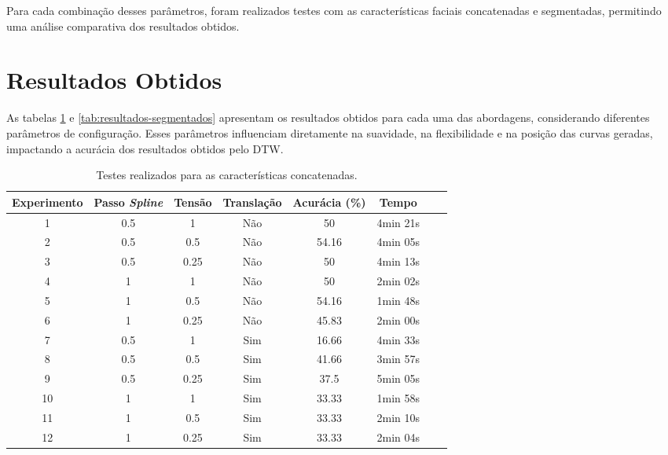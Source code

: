 Para cada combinação desses parâmetros, foram realizados testes com as características faciais concatenadas e segmentadas, permitindo uma análise comparativa dos resultados obtidos.

\section{Resultados Obtidos}

 As tabelas \ref{tab:resultados-concatenados} e \ref{tab:resultados-segmentados} apresentam os resultados obtidos para cada uma das abordagens, considerando diferentes parâmetros de configuração. Esses parâmetros influenciam diretamente na suavidade, na flexibilidade e na posição das curvas geradas, impactando a acurácia dos resultados obtidos pelo DTW.

\begin{table}[h!]
    \centering
    \caption{Testes realizados para as características concatenadas.}
    \begin{tabular}{|c|c|c|c|c|c|c|c|}
    \hline
    \textbf{Experimento} & \textbf{Passo \textit{Spline}} & \textbf{Tensão} & \textbf{Translação} & \textbf{Acurácia (\%)} & \textbf{Tempo} \\
    \hline
    1 & 0.5 & 1 & Não & 50 & 4min 21s\\
    2 & 0.5 & 0.5 & Não & 54.16 & 4min 05s\\
    3 & 0.5 & 0.25 & Não & 50 & 4min 13s\\

    4 & 1 & 1 & Não & 50 & 2min 02s\\
    5 & 1 & 0.5 & Não & 54.16 & 1min 48s\\
    6 & 1 & 0.25 & Não & 45.83 & 2min 00s\\

    7 & 0.5 & 1 & Sim & 16.66 & 4min 33s \\
    8 & 0.5 & 0.5 & Sim & 41.66 & 3min 57s \\
    9 & 0.5 & 0.25 & Sim & 37.5 & 5min 05s\\
 
    10 & 1 & 1 & Sim & 33.33 & 1min 58s \\
    11 & 1 & 0.5 & Sim & 33.33 & 2min 10s \\
    12 & 1 & 0.25 & Sim & 33.33 & 2min 04s \\
    \hline
    \end{tabular}
    \label{tab:resultados-concatenados}
\end{table}

